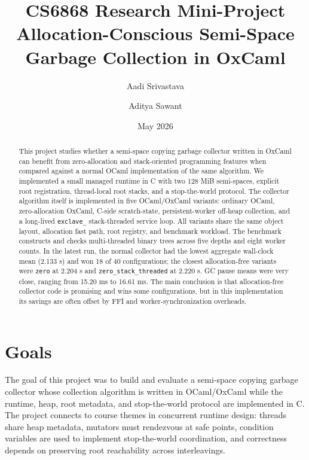 \documentclass[11pt,a4paper]{article}
\title{%
  \textbf{CS6868 Research Mini-Project} \\[0.3em]
  \Large Allocation-Conscious Semi-Space Garbage Collection in OxCaml%
}
\author{%
  Aadi Srivastava
  \and
  Aditya Sawant
}
\date{May 2026}
\begin{document}
\maketitle

\begin{abstract}
This project studies whether a semi-space copying garbage collector written in
OxCaml can benefit from zero-allocation and stack-oriented programming features
when compared against a normal OCaml implementation of the same algorithm.  We
implemented a small managed runtime in C with two 128 MiB semi-spaces, explicit
root registration, thread-local root stacks, and a stop-the-world protocol.  The
collector algorithm itself is implemented in five OCaml/OxCaml variants:
ordinary OCaml, zero-allocation OxCaml, C-side scratch-state, persistent-worker
off-heap collection, and a long-lived \texttt{exclave\_} stack-threaded service
loop.  All variants share the same object layout, allocation fast path, root
registry, and benchmark workload.  The benchmark constructs and checks
multi-threaded binary trees across five depths and eight worker counts.  In the
latest run, the normal collector had the lowest aggregate wall-clock mean
(2.133 s) and won 18 of 40 configurations; the closest allocation-free variants
were \texttt{zero} at 2.204 s and \texttt{zero\_stack\_threaded} at 2.220 s.
GC pause means were very close, ranging from 15.20 ms to 16.61 ms.  The main
conclusion is that allocation-free collector code is promising and wins some
configurations, but in this implementation its savings are often offset by FFI
and worker-synchronization overheads.
\end{abstract}

\section{Goals}
\label{sec:goals}

The goal of this project was to build and evaluate a semi-space copying garbage
collector whose collection algorithm is written in OCaml/OxCaml while the
runtime, heap, root metadata, and stop-the-world protocol are implemented in C.
The project connects to course themes in concurrent runtime design: threads
share heap metadata, mutators must rendezvous at safe points, condition
variables are used to implement stop-the-world coordination, and correctness
depends on preserving root reachability across interleavings.
\end{document}
